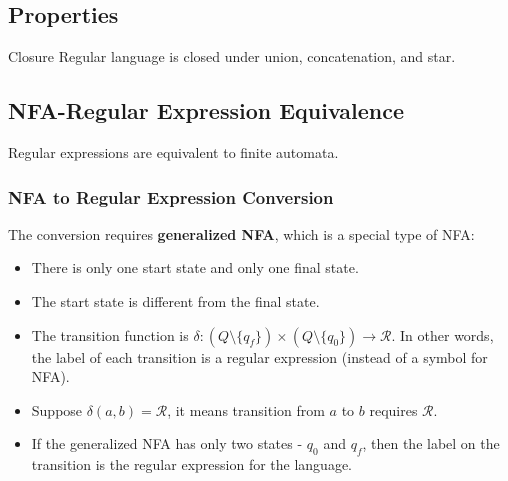\subsection{Properties}

\begin{Theorem}{Closure}{}
	Regular language is closed under union, concatenation, and star.
\end{Theorem}

\subsection{NFA-Regular Expression Equivalence}

\begin{Theorem}{}{}
	Regular expressions are equivalent to finite automata.
\end{Theorem}

\subsubsection{NFA to Regular Expression Conversion}
The conversion requires \textbf{generalized NFA}, which is a special type of NFA:
\begin{itemize}
	\item There is only one start state and only one final state.
	\item The start state is different from the final state.
	\item The transition function is $\delta: (Q \setminus \{ q_f \}) \times (Q \setminus \{ q_0 \}) \to \mathcal{R}$. In other words, the label of each transition is a regular expression (instead of a symbol for NFA).
	\item Suppose $\delta(a, b) = \mathcal{R}$, it means transition from $a$ to $b$ requires $\mathcal{R}$.
	\item If the generalized NFA has only two states - $q_0$ and $q_f$,
	      then the label on the transition is the regular expression for the language.
\end{itemize}
